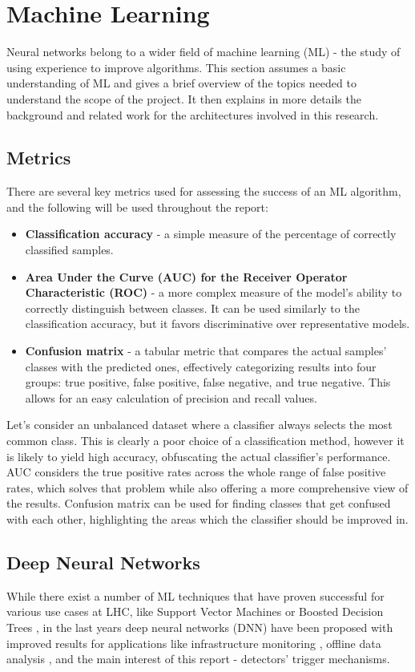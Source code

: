 \section{Machine Learning}
Neural networks belong to a wider field of machine learning (ML) - the study of using experience to improve algorithms. This section assumes a basic understanding of ML and gives a brief overview of the topics needed to understand the scope of the project. It then explains in more details the background and related work for the architectures involved in this research.


\subsection{Metrics} \label{ml-accuracy-auc-confusion}
There are several key metrics used for assessing the success of an ML algorithm, and the following will be used throughout the report:

\begin{itemize}
  \item \textbf{Classification accuracy} - a simple measure of the percentage of correctly classified samples.
  \item \textbf{Area Under the Curve (AUC) for the Receiver Operator Characteristic (ROC)} - a more complex measure of the model's ability to correctly distinguish between classes. It can be used similarly to the classification accuracy, but it favors discriminative over representative models.
  \item \textbf{Confusion matrix} - a tabular metric that compares the actual samples' classes with the predicted ones, effectively categorizing results into four groups: true positive, false positive, false negative, and true negative. This allows for an easy calculation of precision and recall values.
\end{itemize}

Let's consider an unbalanced dataset where a classifier always selects the most common class. This is clearly a poor choice of a classification method, however it is likely to yield high accuracy, obfuscating the actual classifier's performance. AUC considers the true positive rates across the whole range of false positive rates, which solves that problem while also offering a more comprehensive view of the results. Confusion matrix can be used for finding classes that get confused with each other, highlighting the areas which the classifier should be improved in.


\subsection{Deep Neural Networks}
While there exist a number of ML techniques that have proven successful for various use cases at LHC, like Support Vector Machines \cite{38-valentino2012classification} or Boosted Decision Trees \cite{pmlr-v42-chen14}, in the last years deep neural networks (DNN) have been proposed with improved results for applications like infrastructure monitoring \cite{39-skoczen2016lstm}, offline data analysis \cite{40-ren2020unveiling}, and the main interest of this report - detectors' trigger mechanisms.

